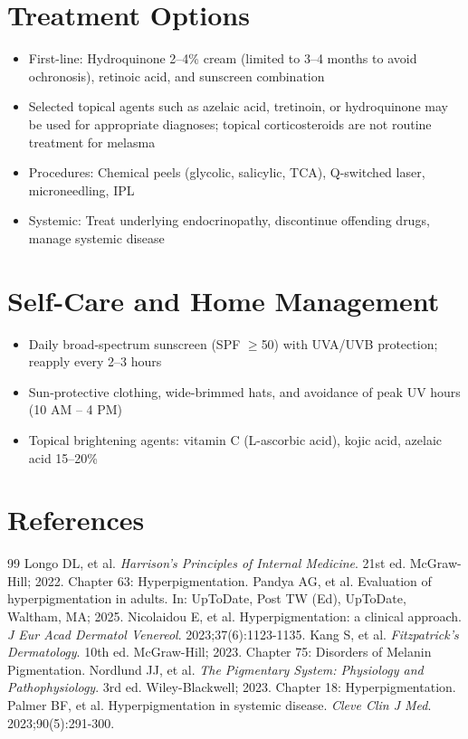 \section*{Treatment Options}
\begin{itemize}
  \item First-line: Hydroquinone 2--4\% cream (limited to 3--4 months to avoid ochronosis), retinoic acid, and sunscreen combination
  \item Selected topical agents such as azelaic acid, tretinoin, or hydroquinone may be used for appropriate diagnoses; topical corticosteroids are not routine treatment for melasma
  \item Procedures: Chemical peels (glycolic, salicylic, TCA), Q-switched laser, microneedling, IPL
  \item Systemic: Treat underlying endocrinopathy, discontinue offending drugs, manage systemic disease
\end{itemize}

\section*{Self-Care and Home Management}
\begin{itemize}
  \item Daily broad-spectrum sunscreen (SPF \ensuremath{\geq}50) with UVA/UVB protection; reapply every 2--3 hours
  \item Sun-protective clothing, wide-brimmed hats, and avoidance of peak UV hours (10 AM -- 4 PM)
  \item Topical brightening agents: vitamin C (L-ascorbic acid), kojic acid, azelaic acid 15--20\%
\end{itemize}

\section*{References}

\begin{thebibliography}{99}
 Longo DL, et al. \emph{Harrison's Principles of Internal Medicine}. 21st ed. McGraw-Hill; 2022. Chapter 63: Hyperpigmentation.
 Pandya AG, et al. Evaluation of hyperpigmentation in adults. In: UpToDate, Post TW (Ed), UpToDate, Waltham, MA; 2025.
 Nicolaidou E, et al. Hyperpigmentation: a clinical approach. \emph{J Eur Acad Dermatol Venereol}. 2023;37(6):1123-1135.
 Kang S, et al. \emph{Fitzpatrick's Dermatology}. 10th ed. McGraw-Hill; 2023. Chapter 75: Disorders of Melanin Pigmentation.
 Nordlund JJ, et al. \emph{The Pigmentary System: Physiology and Pathophysiology}. 3rd ed. Wiley-Blackwell; 2023. Chapter 18: Hyperpigmentation.
 Palmer BF, et al. Hyperpigmentation in systemic disease. \emph{Cleve Clin J Med}. 2023;90(5):291-300.
\end{thebibliography}
